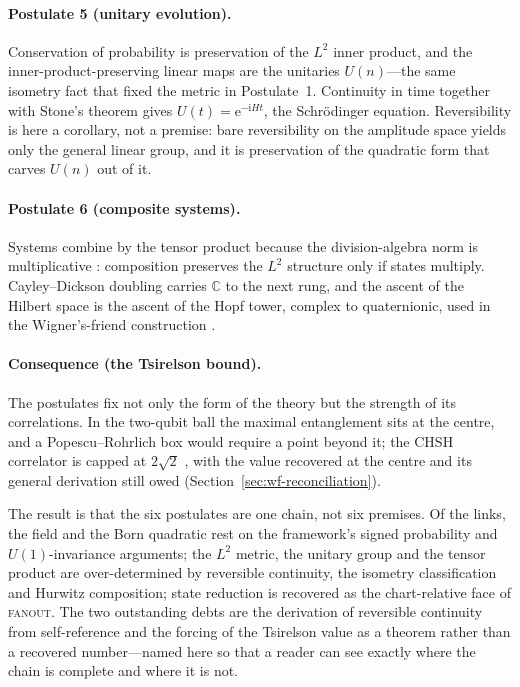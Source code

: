 \documentclass{article}
\begin{document}
\paragraph{Postulate 5 (unitary evolution).}
Conservation of probability is preservation of the $L^{2}$ inner product, and the
inner-product-preserving linear maps are the unitaries $U(n)$---the same
isometry fact that fixed the metric in Postulate~1. Continuity in time together
with Stone's theorem gives $U(t)=\mathrm{e}^{-\mathrm{i}Ht}$, the Schr\"odinger
equation. Reversibility is here a corollary, not a premise: bare reversibility on
the amplitude space yields only the general linear group, and it is preservation
of the quadratic form that carves $U(n)$ out of it.

\paragraph{Postulate 6 (composite systems).}
Systems combine by the tensor product because the division-algebra norm is
multiplicative \autocite{hurwitz_1898}: composition preserves the $L^{2}$ structure
only if states multiply. Cayley--Dickson doubling carries $\mathbb{C}$ to the next
rung, and the ascent of the Hilbert space is the ascent of the Hopf tower, complex
to quaternionic, used in the Wigner's-friend construction
\autocite{MosseriDandoloff2001}.

\paragraph{Consequence (the Tsirelson bound).}
The postulates fix not only the form of the theory but the strength of its
correlations. In the two-qubit ball the maximal entanglement sits at the centre,
and a Popescu--Rohrlich box \autocite{PopescuRohrlich1994} would require a point
beyond it; the CHSH correlator is capped at $2\sqrt{2}$
\autocite{Cirelson1980QuantumInequality, VerstraeteWolf2002, Held2021}, with the value recovered
at the centre and its general derivation still owed
(Section~\ref{sec:wf-reconciliation}).

\medskip
\noindent The result is that the six postulates are one chain, not six premises.
Of the links, the field and the Born quadratic rest on the framework's signed
probability and $U(1)$-invariance arguments; the $L^{2}$ metric, the unitary group
and the tensor product are over-determined by reversible continuity, the isometry
classification and Hurwitz composition; state reduction is recovered as the
chart-relative face of \textsc{fanout}. The two outstanding debts are the
derivation of reversible continuity from self-reference and the forcing of the
Tsirelson value as a theorem rather than a recovered number---named here so that a
reader can see exactly where the chain is complete and where it is not.
\end{document}
